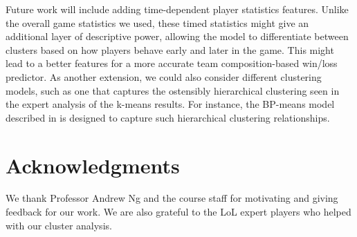 \documentclass[letterpaper,10 pt,conference]{ieeeconf}
\begin{document}
Future work will include adding time-dependent player statistics features. Unlike the overall game statistics we used, these timed statistics might give an additional layer of descriptive power, allowing the model to differentiate between clusters based on how players behave early and later in the game. This might lead to a better features for a more accurate team composition-based win/loss predictor. As another extension, we could also consider different clustering models, such as one that captures the ostensibly hierarchical clustering seen in the expert analysis of the k-means results. For instance, the BP-means model described in \cite{TKJ:13} is designed to capture such hierarchical clustering relationships. 

\section*{Acknowledgments}
We thank Professor Andrew Ng and the course staff for motivating and giving feedback for our work. We are also grateful to the LoL expert players who helped with our cluster analysis.


\end{document}
